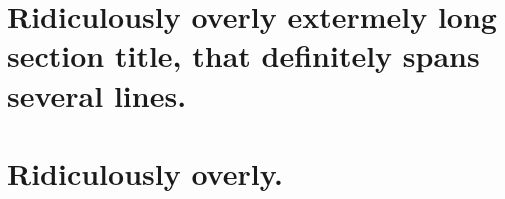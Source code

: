 \documentclass[draft]{article}
\begin{document}
\section{Ridiculously overly extermely long section title, that definitely spans several lines.}

\lipsum[2]
\section{Ridiculously overly.}

\lipsum[2]
\end{document}
